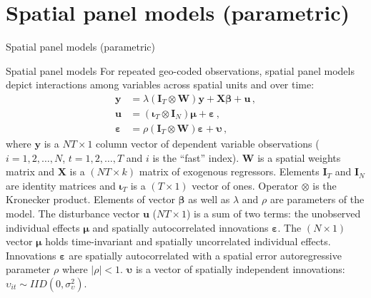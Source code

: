 \documentclass{beamer}
\newcommand{\Ms}[2]{\bm{#1}_{#2}}
\begin{document}
\section{Spatial panel models (parametric)}
\begin{frame}{Spatial panel models (parametric)}
\end{frame}
\begin{frame}{Spatial panel models}
For repeated geo-coded observations, spatial panel models depict interactions among variables across spatial units and over time:
\begin{equation*}
\begin{aligned}
  \bm{y}  &= 
  \lambda \left( \Ms{I}{T} \otimes \bm{W} \right) \bm{y} + \bm{X\beta} + \bm{u}\,, \\
  \bm{u} &= 
  \left( \Ms{\iota}{T} \otimes \Ms{I}{N} \right) \bm{\mu} + \bm{\varepsilon}\,, \\
  \bm{\varepsilon} &= \rho
  \left( \Ms{I}{T} \otimes \bm{W} \right) \bm{\varepsilon} + \bm{\upsilon}\,,
\end{aligned}
\end{equation*}
\small{where $\bm{y}$ is a $NT \!\times \!1$ column vector of dependent variable observations ($i = 1, 2, \dots, N$, $t=1,2, \dots, T$ and $i$ is the ``fast'' index). $\bm{W}$ is a spatial weights matrix and $\bm{X}$ is a $(NT \!\times \!k)$ matrix of exogenous regressors. Elements $\Ms{I}{T}$ and $\Ms{I}{N}$ are identity matrices and $\Ms{\iota}{T}$ is a  $(T \! \times \!1)$ vector of ones. Operator $\otimes$ is the Kronecker product. Elements of vector $\bm{\beta}$ as well as $\lambda$ and $\rho$ are parameters of the model. The disturbance vector $\bm{u}$ ($NT \!\times \!1$) is a sum of two terms: the unobserved individual effects $\bm{\mu}$ and spatially autocorrelated innovations $\bm{\varepsilon}$. The $(N \!\times \!1)$ vector $\bm{\mu}$ holds time-invariant and spatially uncorrelated individual effects. Innovations $\bm{\varepsilon}$ are spatially autocorrelated with a spatial error autoregressive parameter $\rho$ where $|\rho| < 1$. $\bm{\upsilon}$ is a vector of spatially independent innovations: $\upsilon_{it} \sim \textit{IID} \left( 0,\sigma_{\upsilon}^2 \right)$.}
\end{frame}
\end{document}
